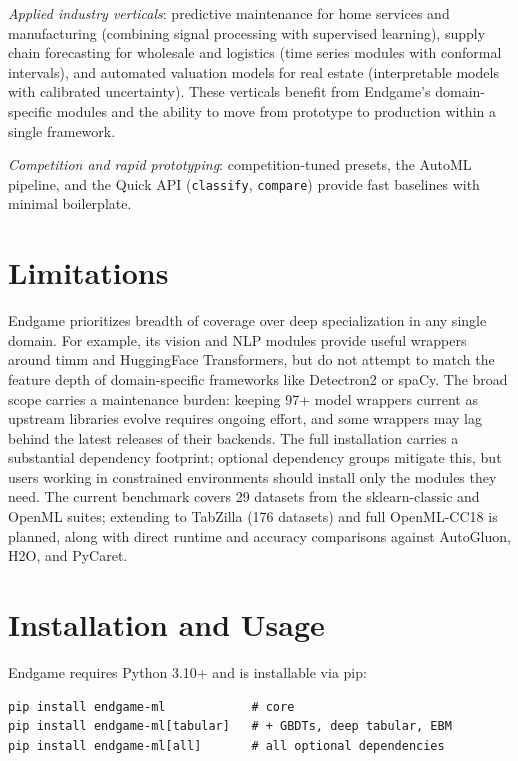 \documentclass[11pt]{article}
\begin{document}
\emph{Applied industry verticals}: predictive maintenance for home services
and manufacturing (combining signal processing with supervised learning),
supply chain forecasting for wholesale and logistics (time series modules
with conformal intervals), and automated valuation models for real estate
(interpretable models with calibrated uncertainty). These verticals benefit
from Endgame's domain-specific modules and the ability to move from
prototype to production within a single framework.

\emph{Competition and rapid prototyping}: competition-tuned presets, the
AutoML pipeline, and the Quick API (\texttt{classify}, \texttt{compare})
provide fast baselines with minimal boilerplate.

\section{Limitations}
\label{sec:limitations}

Endgame prioritizes breadth of coverage over deep specialization in any
single domain. For example, its vision and NLP modules provide useful
wrappers around timm and HuggingFace Transformers, but do not attempt to
match the feature depth of domain-specific frameworks like Detectron2 or
spaCy. The broad scope carries a maintenance burden: keeping 97+ model
wrappers current as upstream libraries evolve requires ongoing effort, and
some wrappers may lag behind the latest releases of their backends. The full
installation carries a substantial dependency footprint; optional dependency
groups mitigate this, but users working in constrained environments should
install only the modules they need. The current benchmark covers 29 datasets
from the sklearn-classic and OpenML suites; extending to
TabZilla \citep{mcelfresh2024neural} (176 datasets) and full OpenML-CC18 is
planned, along with direct runtime and accuracy comparisons against
AutoGluon, H2O, and PyCaret.

\section{Installation and Usage}
\label{sec:usage}

Endgame requires Python 3.10+ and is installable via pip:

\begin{verbatim}
pip install endgame-ml            # core
pip install endgame-ml[tabular]   # + GBDTs, deep tabular, EBM
pip install endgame-ml[all]       # all optional dependencies
\end{verbatim}
\end{document}
